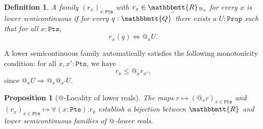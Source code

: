 \documentclass[reqno,11pt]{amsproc}
\makeatletter
\theoremstyle{plain}
\newtheorem{proposition}[theorem]{Proposition}
\newtheorem{definition}[theorem]{Definition}
\theoremstyle{definition}
\newcommand{\Const}[1]{\mathtt{#1}}
\newcommand{\ubar}[1]{\underaccent{\bar}{#1}}
\newcommand{\internal}[1]{\raisebox{-.03ex}{$\mathbbmtt{#1}$}}
\newcommand{\hs}{\hspace{1pt}}
\newcommand{\tqq}{\internal{Q}\hs}
\newcommand{\trr}{\internal{R}}
\newcommand{\tlrr}{\ubar{\trr}\hs}
\newcommand{\prop}{\Const{Prop}}
\newcommand{\pt}{x}
\newcommand{\pts}{\mathtt{Pts}}		%
\newcommand{\atsymbol}{{@}}
\newcommand{\at}[1][\pt]{\atsymbol_{#1}}
\newcommand{\imp}{\Rightarrow}
\numberwithin{equation}{section}
\makeatother
\begin{document}
\begin{definition}
	A family $(r_\pt)_{\pt : \pts}$ with $r_\pt \in \tlrr_{\at}$ for every $\pt$ is \emph{lower semicontinuous} if for every $q:\tqq$ there exists a $U:\prop$ such that for all $\pt : \pts$,
	\begin{equation}\label{eqn.witness}
		r_\pt(q) \Leftrightarrow \at U.
	\end{equation}
\end{definition}

A lower semicontinuous family automatically satisfies the following monotonicity condition: for all $\pt,\pt' : \pts$, we have
\begin{equation}
	\label{r_pt_monotone}
	r_\pt \le \at r_{\pt'},
\end{equation}
since $\at U \imp \at \at[\pt'] U$.

\begin{proposition}[{$\at[]$-Locality of lower reals}]
	\label{prop:LR_locality}
	The maps $r \mapsto (\at r)_{\pt\in\pts}$ and $(r_\pt)_{\pt\in\pts}\mapsto \forall(\pt:\pts).r_k$ establish a bijection between $\tlrr$ and lower semicontinuous families of $\at[]$-lower reals.
\end{proposition}
\end{document}
